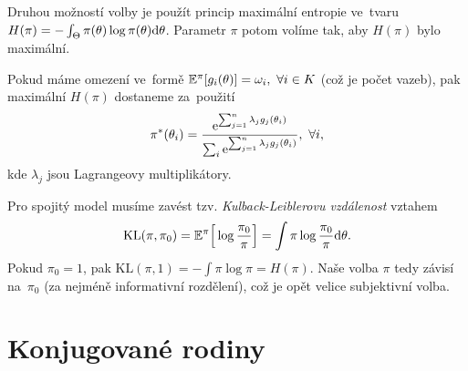 Druhou možností volby je použít princip  maximální entropie ve~tvaru $H(\pi)=-\int_\Theta\pi(\theta)\log \pi(\theta)\mathrm{d}\theta$. Parametr $\pi$ potom volíme tak, aby $H(\pi)$ bylo maximální.

Pokud máme omezení ve~formě $\mathbb{E}^\pi[g_i(\theta)]=\omega_i,~\forall i\in K$ (což je počet vazeb), pak maximální $H(\pi)$ dostaneme za~použití $$\pi^\ast(\theta_i)=\frac{\mathrm{e}^{\sum_{j=1}^n \lambda_j g_j(\theta_i)}}{\sum_i \mathrm{e}^{\sum_{j=1}^n \lambda_jg_j(\theta_i)}},~\forall i,$$
kde $\lambda_j$ jsou Lagrangeovy multiplikátory.

Pro spojitý model musíme zavést tzv. \textit{Kulback-Leiblerovu vzdálenost} vztahem
$$ \mathrm{KL}(\pi,\pi_0)=\mathbb{E}^\pi\Big[\log\frac{\pi_0}{\pi}\Big]=\int\pi\log\frac{\pi_0}{\pi}\mathrm{d}\theta.$$
Pokud $\pi_0=1$, pak $\mathrm{KL}(\pi,1)=-\int\pi\log\pi=H(\pi)$. Naše volba $\pi$ tedy závisí na~$\pi_0$ (za nejméně informativní rozdělení), což je opět velice subjektivní volba.

\section{Konjugované rodiny}

